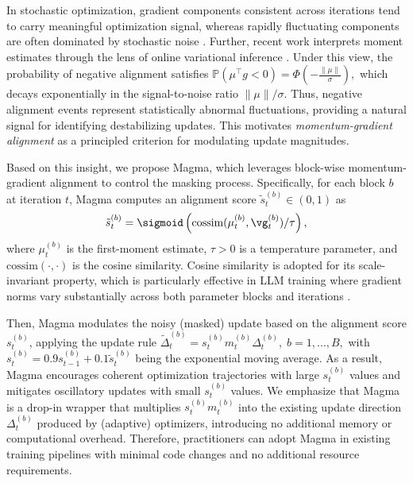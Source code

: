 \documentclass[11pt, a4paper, twocolumn, copyright, goog]{google}
\theoremstyle{plain}
\theoremstyle{definition}
\theoremstyle{remark}
\begin{document}
In stochastic optimization, gradient components consistent across iterations tend to carry meaningful optimization signal, whereas rapidly fluctuating components are often dominated by stochastic noise \citep{polyak1964some,riedmiller1993direct,bottou2018optimization}.
Further, recent work interprets moment estimates through the lens of online variational inference \citep{orvieto2025search}. Under this view, the probability of negative alignment satisfies
$\mathbb{P}(\mu^\top g < 0) = \Phi \left(-\frac{\|\mu\|}{\sigma} \right),$ which decays exponentially in the signal-to-noise ratio $\|\mu\|/\sigma$.
Thus, negative alignment events represent statistically abnormal fluctuations, providing a natural signal for identifying destabilizing updates.
This motivates \emph{momentum-gradient alignment} as a principled criterion for modulating update magnitudes.



Based on this insight, we propose Magma, which leverages block-wise momentum-gradient alignment to control the masking process.
Specifically, for each block $b$ at iteration $t$, Magma computes an alignment score $\tilde{s}_t^{(b)} \in (0,1)$ as
\begin{equation} \label{eq:masking_prob}
    \tilde{s}_t^{(b)} = \sigmoid\left( \textrm{cossim}(\mu_t^{(b)}, \vg_t^{(b)}) / \tau \right),
\end{equation}
where $\mu_t^{(b)}$ is the first-moment estimate, $\tau > 0$ is a temperature parameter, and $\textrm{cossim}(\cdot, \cdot)$ is the cosine similarity. 
Cosine similarity is adopted for its scale-invariant property, which is particularly effective in LLM training where gradient norms vary substantially across both parameter blocks and iterations \citep{huang2025spam, wen2025sron}. 


Then, Magma modulates the noisy (masked) update based on the alignment score $s_t^{(b)}$, applying the update rule $\tilde{\Delta}_t^{(b)} =  s_t^{(b)} m_{t}^{(b)}\Delta_t^{(b)}, \; b = 1,\ldots,B,$ with $s_t^{(b)} = 0.9 s_{t-1}^{(b)} + 0.1 \tilde{s}_t^{(b)}$ being the exponential moving average.
As a result, Magma encourages coherent optimization trajectories with large $s_t^{(b)}$ values and mitigates oscillatory updates with small $s_t^{(b)}$ values. 
We emphasize that Magma is a drop-in wrapper that multiplies $s_t^{(b)} m_{t}^{(b)}$ into the existing update direction $\Delta_t^{(b)}$ produced by (adaptive) optimizers, introducing no additional memory or computational overhead.
Therefore, practitioners can adopt Magma in existing training pipelines with minimal code changes and no additional resource requirements.
\end{document}
